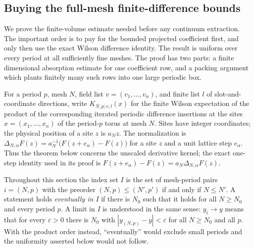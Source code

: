 \subsection{Buying the full-mesh finite-difference bounds}
\label{sec:ex-fullmesh-fixedbounds}

We prove the finite-volume estimate needed before any continuum extraction. The
important order is to pay for the bounded projected coefficient first, and only
then use the exact Wilson difference identity. The result is uniform over every
period at all sufficiently fine meshes. The proof has two parts: a finite
dimensional absorption estimate for one coefficient row, and a packing argument
which plants finitely many such rows into one large periodic box.

For a period $p$, mesh $N$, field list $v=(v_1,\ldots,v_n)$, and finite
list $l$ of slot-and-coordinate directions, write $K_{N,p;v,l}(x)$ for the
finite Wilson expectation of the product of the corresponding iterated
periodic difference insertions at the sites $x=(x_1,\ldots,x_n)$ of the
period-$p$ torus at mesh $N$. Sites have integer coordinates; the physical
position of a site $z$ is $a_Nz$. The normalization is
$\Delta_{N,\alpha}F(z)=a_N^{-1}\bigl(F(z+e_\alpha)-F(z)\bigr)$ for a site $z$
and a unit lattice step $e_\alpha$. Thus the theorem below concerns the
unscaled derivative kernel; the exact one-step identity used in its proof is
$F(z+e_\alpha)-F(z)=a_N\Delta_{N,\alpha}F(z)$.

Throughout this section the index set $I$ is the set of mesh-period pairs
$i=(N,p)$ with the preorder $(N,p)\le(N',p')$ if and only if $N\le N'$.
A statement holds \emph{eventually in $I$} if there is $N_0$ such that it
holds for all $N\ge N_0$ and every period $p$. A limit in $I$ is understood
in the same sense: $y_i\to y$ means that for every $\varepsilon>0$ there is
$N_0$ with $|y_{(N,p)}-y|<\varepsilon$ for all $N\ge N_0$ and all $p$.
With the product order instead, ``eventually'' would exclude small periods
and the uniformity asserted below would not follow.

